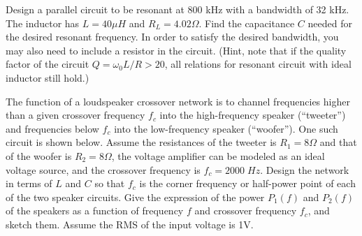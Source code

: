 %
%
% 


\item Design a parallel circuit to be resonant at 800 kHz with a bandwidth
of 32 kHz. The inductor has $L=40 \mu H$ and $R_L=4.02 \Omega$. Find the
capacitance $C$ needed for the desired resonant frequency. In order to
satisfy the desired bandwidth, you may also need to include a resistor 
in the circuit. (Hint, note that if the quality factor of the circuit
$Q=\omega_0 L/R > 20$, all relations for resonant circuit with ideal
inductor still hold.)



\item The function of a loudspeaker crossover network is to channel 
frequencies higher than a given crossover frequency $f_c$ into the
high-frequency speaker (``tweeter'') and frequencies below $f_c$ into
the low-frequency speaker (``woofer''). One such circuit is shown below.
Assume the resistances of the tweeter is $R_1=8\Omega$ and that of the 
woofer is $R_2=8\Omega$, the voltage amplifier can be modeled as an
ideal voltage source, and the crossover frequency is $f_c=2000\; Hz$.
Design the network in terms of $L$ and $C$ so that $f_c$ is the corner
frequency or half-power point of each of the two speaker circuits. Give 
the expression of the power $P_1(f)$ and $P_2(f)$ of the speakers as a 
function of frequency $f$ and crossover frequency $f_c$, and sketch them.
Assume the RMS of the input voltage is 1V.

